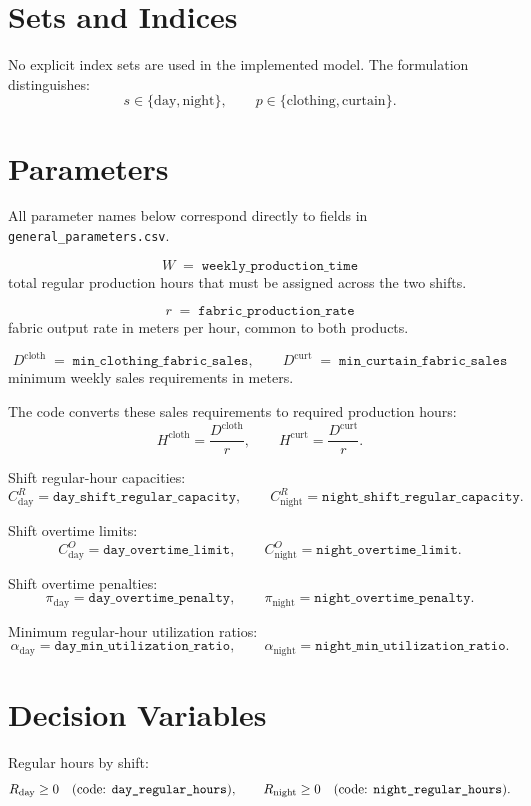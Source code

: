 \section*{Sets and Indices}

No explicit index sets are used in the implemented model. The formulation distinguishes:
\[
s \in \{\text{day},\text{night}\}, \qquad
p \in \{\text{clothing},\text{curtain}\}.
\]

\section*{Parameters}

All parameter names below correspond directly to fields in \texttt{general\_parameters.csv}.

\[
W \;=\; \texttt{weekly\_production\_time}
\]
total regular production hours that must be assigned across the two shifts.

\[
r \;=\; \texttt{fabric\_production\_rate}
\]
fabric output rate in meters per hour, common to both products.

\[
D^{\text{cloth}} \;=\; \texttt{min\_clothing\_fabric\_sales}, \qquad
D^{\text{curt}} \;=\; \texttt{min\_curtain\_fabric\_sales}
\]
minimum weekly sales requirements in meters.

The code converts these sales requirements to required production hours:
\[
H^{\text{cloth}} = \frac{D^{\text{cloth}}}{r}, \qquad
H^{\text{curt}} = \frac{D^{\text{curt}}}{r}.
\]

Shift regular-hour capacities:
\[
C^{R}_{\text{day}} = \texttt{day\_shift\_regular\_capacity}, \qquad
C^{R}_{\text{night}} = \texttt{night\_shift\_regular\_capacity}.
\]

Shift overtime limits:
\[
C^{O}_{\text{day}} = \texttt{day\_overtime\_limit}, \qquad
C^{O}_{\text{night}} = \texttt{night\_overtime\_limit}.
\]

Shift overtime penalties:
\[
\pi_{\text{day}} = \texttt{day\_overtime\_penalty}, \qquad
\pi_{\text{night}} = \texttt{night\_overtime\_penalty}.
\]

Minimum regular-hour utilization ratios:
\[
\alpha_{\text{day}} = \texttt{day\_min\_utilization\_ratio}, \qquad
\alpha_{\text{night}} = \texttt{night\_min\_utilization\_ratio}.
\]

\section*{Decision Variables}

Regular hours by shift:
\[
R_{\text{day}} \ge 0 \quad \text{(code: \texttt{day\_regular\_hours})}, \qquad
R_{\text{night}} \ge 0 \quad \text{(code: \texttt{night\_regular\_hours})}.
\]

